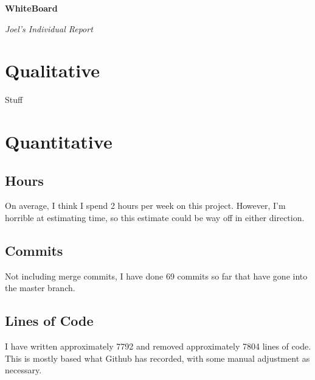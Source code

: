 \documentclass[12 pt]{article}
\begin{document}
\begin{center}

    \huge{\textbf{WhiteBoard}}

    \huge{\textit{Joel's Individual Report}}

\end{center}

\vspace{10 pt}

\section{Qualitative}

Stuff

\section{Quantitative}

\subsection{Hours}

On average, I think I spend 2 hours per week on this project. However, I'm
horrible at estimating time, so this estimate could be way off in either
direction.

\subsection{Commits}

Not including merge commits, I have done 69 commits so far that have gone into
the master branch.

\subsection{Lines of Code}

I have written approximately 7792 and removed approximately 7804 lines of code.
This is mostly based what Github has recorded, with some manual adjustment as
necessary.
\end{document}
